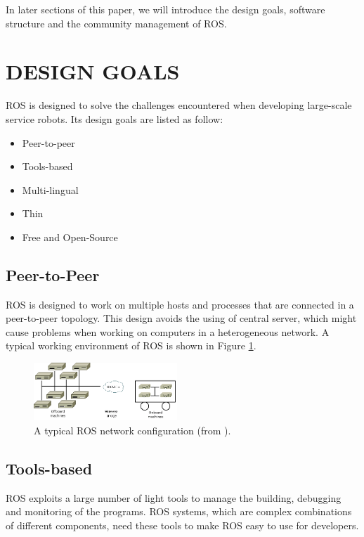\documentclass[a4paper, 10pt, conference]{ieeeconf}       %
\begin{document}
In later sections of this paper, we will introduce the design goals, software structure and the community management of ROS. 

\section{DESIGN GOALS}

ROS is designed to solve the challenges encountered when developing large-scale service robots\cite{quigley_ros:_2009}. Its design goals are listed as follow:
\begin{itemize}
  \item Peer-to-peer
  \item Tools-based
  \item Multi-lingual
  \item Thin
  \item Free and Open-Source
\end{itemize}

\subsection{Peer-to-Peer}

ROS is designed to work on multiple hosts and processes that are connected in a peer-to-peer topology. This design avoids the using of central server, which might cause problems when working on computers in a heterogeneous network. A typical working environment of ROS is shown in Figure \ref{fig:network}.

\begin{figure}[htpb]
  \centering
  \includegraphics[width=0.48\textwidth]{network}
  \caption{A typical ROS network configuration (from \cite{quigley_ros:_2009}).}
  \label{fig:network}
\end{figure}

\subsection{Tools-based} 

ROS exploits a large number of light tools to manage the building, debugging and monitoring of the programs. ROS systems, which are complex combinations of different components, need these tools to make ROS easy to use for developers.
\end{document}
